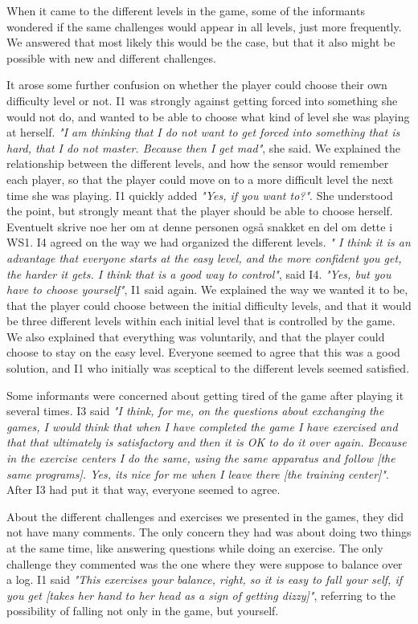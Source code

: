 When it came to the different levels in the game, some of the informants wondered if the same challenges would appear in all levels, just more frequently. We answered that most likely this would be the case, but that it also might be possible with new and different challenges. 

It arose some further confusion on whether the player could choose their own difficulty level or not. I1 was strongly against getting forced into something she would not do, and wanted to be able to choose what kind of level she was playing at herself. \emph{"I am thinking that I do not want to get forced into something that is hard, that I do not master. Because then I get mad"}, she said. We explained the relationship between the different levels, and how the sensor would remember each player, so that the player could move on to a more difficult level the next time she was playing. I1 quickly added \emph{"Yes, if you want to?"}.  She understood the point, but strongly meant that the player should be able to choose herself. Eventuelt skrive noe her om at denne personen også snakket en del om dette i WS1.
I4 agreed on the way we had organized the different levels. \emph{"
I think it is an advantage that everyone starts at the easy level, and the more confident you get, the harder it gets. I think that is a good way to control"}, said I4. \emph{"Yes, but you have to choose yourself"}, I1 said again. We explained the way we wanted it to be, that the player could choose between the initial difficulty levels, and that it would be three different levels within each initial level that is controlled by the game. We also explained that everything was voluntarily, and that the player could choose to stay on the easy level. Everyone seemed to agree that this was a good solution, and I1 who initially was sceptical to the different levels seemed satisfied. 

Some informants were concerned about getting tired of the game after playing it several times. I3 said \emph{"I think, for me, on the questions about exchanging the games, I would think that when I have completed the game I have exercised and that that ultimately is satisfactory and then it is OK to do it over again. Because in the exercise centers I do the same, using the same apparatus and follow [the same programs]. Yes, its nice for me when I leave there [the training center]"}. After I3 had put it that way, everyone seemed to agree. 

About the different challenges and exercises we presented in the games, they did not have many comments. The only concern they had was about doing two things at the same time, like answering questions while doing an exercise. The only challenge they commented was the one where they were suppose to balance over a log. I1 said \emph{"This exercises your balance, right, so it is easy to fall your self, if you get [takes her hand to her head as a sign of getting dizzy]"}, referring to the possibility of falling not only in the game, but yourself. 

